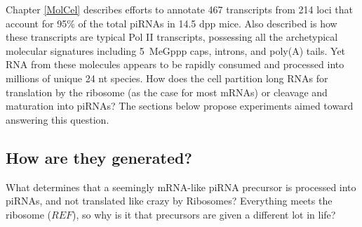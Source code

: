   Chapter \ref{MolCel} describes efforts to annotate 467 transcripts from 214 loci that account for 95\% of the total piRNAs in 14.5 dpp mice. Also described is how these transcripts are typical Pol II transcripts, possessing all the archetypical molecular signatures including 5\textprime~MeGppp caps, introns, and poly(A) tails. Yet RNA from these molecules appears to be rapidly consumed and processed into millions of unique 24 nt species. How does the cell partition long RNAs for translation by the ribosome (as the case for most mRNAs) or cleavage and maturation into piRNAs? The sections below propose experiments aimed toward answering this question.

  \subsection{How are they generated?}\label{Disc:subsec:How are precursors generated}


    What determines that a seemingly mRNA-like piRNA precursor is processed into piRNAs, and not translated like crazy by Ribosomes?  Everything meets the ribosome ($REF$), so why is it that precursors are given a different lot in life?

